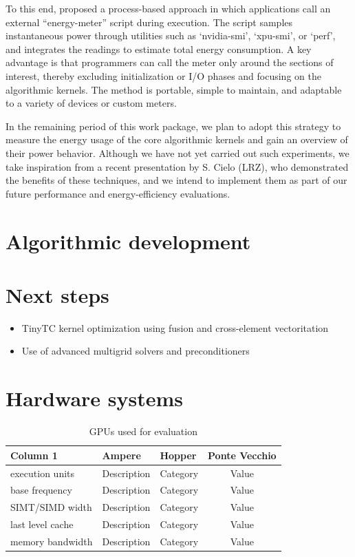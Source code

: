 \documentclass[a4paper,12pt]{article}
\begin{document}
To this end, \cite{Cielo25} proposed a process-based approach in which applications call an external ``energy-meter'' script during execution. The script samples instantaneous power through utilities such as `nvidia-smi', `xpu-smi', or `perf', and integrates the readings to estimate total energy consumption. A key advantage is that programmers can call the meter only around the sections of interest, thereby excluding initialization or I/O phases and focusing on the algorithmic kernels. The method is portable, simple to maintain, and adaptable to a variety of devices or custom meters. 

In the remaining period of this work package, we plan to adopt this strategy to measure the energy usage of the core algorithmic kernels and gain an overview of their power behavior. Although we have not yet carried out such experiments, we take inspiration from a recent presentation by S. Cielo (LRZ), who demonstrated the benefits of these techniques, and we intend to implement them as part of our future performance and energy-efficiency evaluations.

\section{Algorithmic development}


\section{Next steps}

\begin{itemize}
    \item TinyTC kernel optimization using fusion and cross-element vectoritation
    \item Use of advanced multigrid solvers and preconditioners
\end{itemize}


\section{Hardware systems}

\begin{center}
    \begin{table}[h!]
    \small
    \caption{GPUs used for evaluation}
    \renewcommand{\arraystretch}{1.25}
    \label{tab:example_table}
    \begin{tabular}{|l|l|l|c|}
    \hline
    \textbf{Column 1} & \textbf{Ampere} & \textbf{Hopper} & \textbf{Ponte Vecchio} \\
    \hline
    execution units & Description & Category & Value \\
    base frequency & Description & Category & Value \\
    SIMT/SIMD width & Description & Category & Value \\
    last level cache & Description & Category & Value \\
    memory bandwidth & Description & Category & Value \\
    \hline
    \end{tabular}
    \end{table}
\end{center}



\label{MyLastPage}
\end{document}
